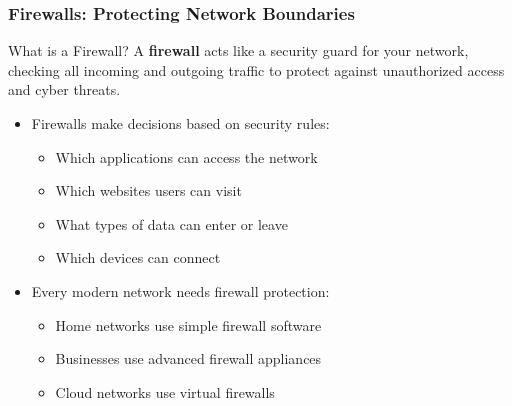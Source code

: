 \documentclass{beamer}
\begin{document}
\begin{frame}
    \frametitle{Firewalls: Protecting Network Boundaries}
    
    \begin{block}{What is a Firewall?}
        A \textbf{firewall} acts like a security guard for your network, checking all incoming and outgoing traffic to protect against unauthorized access and cyber threats.
    \end{block}
    
    \begin{itemize}
        \item Firewalls make decisions based on security rules:
        \begin{itemize}
            \item Which applications can access the network
            \item Which websites users can visit
            \item What types of data can enter or leave
            \item Which devices can connect
        \end{itemize}
        
        \item Every modern network needs firewall protection:
        \begin{itemize}
            \item Home networks use simple firewall software
            \item Businesses use advanced firewall appliances
            \item Cloud networks use virtual firewalls
        \end{itemize}
    \end{itemize}
\end{frame}
\end{document}
